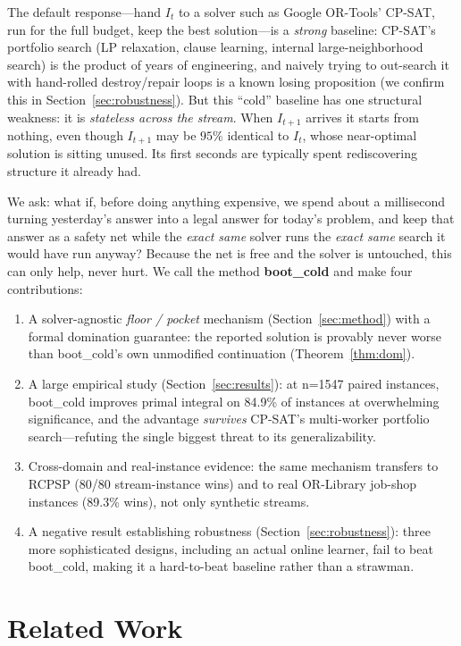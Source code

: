 \documentclass[11pt]{article}                        %
\begin{document}
The default response---hand $I_t$ to a solver such as Google OR-Tools'
CP-SAT, run for the full budget, keep the best solution---is a \emph{strong}
baseline: CP-SAT's portfolio search (LP relaxation, clause learning, internal
large-neighborhood search) is the product of years of engineering, and naively
trying to out-search it with hand-rolled destroy/repair loops is a known
losing proposition (we confirm this in Section~\ref{sec:robustness}). But this
``cold'' baseline has one structural weakness: it is \emph{stateless across
the stream}. When $I_{t+1}$ arrives it starts from nothing, even though
$I_{t+1}$ may be $95\%$ identical to $I_t$, whose near-optimal solution is
sitting unused. Its first seconds are typically spent rediscovering structure
it already had.

We ask: what if, before doing anything expensive, we spend about a millisecond
turning yesterday's answer into a legal answer for today's problem, and keep
that answer as a safety net while the \emph{exact same} solver runs the
\emph{exact same} search it would have run anyway? Because the net is free and
the solver is untouched, this can only help, never hurt. We call the method
\textbf{boot\_cold} and make four contributions:
\begin{enumerate}
  \item A solver-agnostic \emph{floor / pocket} mechanism (Section~\ref{sec:method})
  with a formal domination guarantee: the reported solution is provably never
  worse than boot\_cold's own unmodified continuation (Theorem~\ref{thm:dom}).
  \item A large empirical study (Section~\ref{sec:results}): at n{=}1547 paired
  instances, boot\_cold improves primal integral on 84.9\% of instances at
  overwhelming significance, and the advantage \emph{survives} CP-SAT's
  multi-worker portfolio search---refuting the single biggest threat to its
  generalizability.
  \item Cross-domain and real-instance evidence: the same mechanism transfers
  to RCPSP (80/80 stream-instance wins) and to real OR-Library job-shop
  instances (89.3\% wins), not only synthetic streams.
  \item A negative result establishing robustness (Section~\ref{sec:robustness}):
  three more sophisticated designs, including an actual online learner, fail to
  beat boot\_cold, making it a hard-to-beat baseline rather than a strawman.
\end{enumerate}

\section{Related Work}
\label{sec:related}
\end{document}
